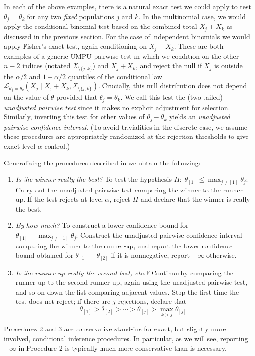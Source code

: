 \documentclass[aos, authoryear]{imsart}
\theoremstyle{definition}
\theoremstyle{custom}
\begin{document}
In each of the above examples, there is a natural exact test we could apply to test $\theta_j=\theta_k$ for any two {\em fixed} populations $j$ and $k$. In the multinomial case, we would apply the conditional binomial test based on the combined total $X_j+X_k$ as discussed in the previous section. For the case of independent binomials we would apply Fisher's exact test, again conditioning on $X_j+X_k$. These are both examples of a generic UMPU pairwise test in which we condition on the other $n-2$ indices (notated $X_{\setminus \{j,k\}}$) and $X_j+X_k$, and reject the null if $X_j$ is outside the $\alpha/2$ and $1-\alpha/2$ quantiles of the conditional law $\mathcal{L}_{\theta_j=\theta_k}(X_j \mid X_j+X_k, X_{\setminus\{j,k\}})$. Crucially, this null distribution does not depend on the value of $\theta$ provided that $\theta_j=\theta_k$. We call this test the (two-tailed) {\em unadjusted pairwise test} since it makes no explicit adjustment for selection. Similarly, inverting this test for other values of $\theta_j-\theta_k$ yields an {\em unadjusted pairwise confidence interval}. (To avoid trivialities in the discrete case, we assume these procedures are appropriately randomized at the rejection thresholds to give exact level-$\alpha$ control.)

Generalizing the procedures described in  we obtain the following:
\begin{enumerate}
\item {\em Is the winner really the best?} To test the hypothesis $H:\; \theta_{[1]} \leq \max_{j \neq [1]} \theta_j$: Carry out the unadjusted pairwise test comparing the winner to the runner-up. If the test rejects at level $\alpha$, reject $H$ and declare that the winner is really the best.
\item {\em By how much?} To construct a lower confidence bound for $\theta_{[1]} - \max_{j \neq [1]} \theta_j$: Construct the unadjusted pairwise confidence interval comparing the winner to the runner-up, and report the lower confidence bound obtained for $\theta_{[1]} - \theta_{[2]}$ if it is nonnegative, report $-\infty$ otherwise.
\item {\em Is the runner-up really the second best, etc.?} Continue by comparing the runner-up to the second runner-up, again using the unadjusted pairwise test, and so on down the list comparing adjacent values. Stop the first time the test does not reject; if there are $j$ rejections, declare that 
\[
\theta_{[1]} > \theta_{[2]} > \cdots > \theta_{[j]} > \max_{k > j} \theta_{[j]}
\]
\end{enumerate}
Procedures 2 and 3 are conservative stand-ins for exact, but slightly more involved, conditional inference procedures. In particular, as we will see, reporting $-\infty$ in Procedure 2 is typically much more conservative than is necessary.
\end{document}
